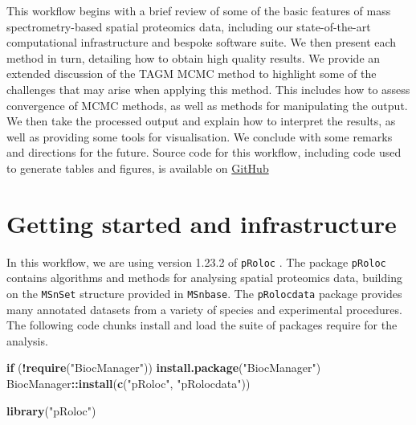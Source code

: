 \documentclass[9pt,a4paper,]{extarticle}
\newenvironment{Shaded}{\begin{snugshade}}{\end{snugshade}}
\newcommand{\ControlFlowTok}[1]{\textcolor[rgb]{0.13,0.29,0.53}{\textbf{#1}}}
\newcommand{\KeywordTok}[1]{\textcolor[rgb]{0.13,0.29,0.53}{\textbf{#1}}}
\newcommand{\NormalTok}[1]{#1}
\newcommand{\OperatorTok}[1]{\textcolor[rgb]{0.81,0.36,0.00}{\textbf{#1}}}
\newcommand{\StringTok}[1]{\textcolor[rgb]{0.31,0.60,0.02}{#1}}
\begin{document}
This workflow begins with a brief review of some of the basic features
of mass spectrometry-based spatial proteomics data, including our
state-of-the-art computational infrastructure and bespoke software
suite. We then present each method in turn, detailing how to obtain
high quality results. We provide an extended discussion of the TAGM
MCMC method to highlight some of the challenges that may arise when
applying this method. This includes how to assess convergence of MCMC
methods, as well as methods for manipulating the output. We then take
the processed output and explain how to interpret the results, as well
as providing some tools for visualisation. We conclude with some
remarks and directions for the future. Source code for this workflow,
including code used to generate tables and figures, is available on
\href{https://github.com/ococrook/TAGMworkflow}{GitHub}
\citep{oliver_m_crook_2019_2593712}

\hypertarget{getting-started-and-infrastructure}{%
\section{Getting started and infrastructure}\label{getting-started-and-infrastructure}}

In this workflow, we are using version 1.23.2 of \texttt{pRoloc}
\citep{pRoloc:2014}. The package \texttt{pRoloc} contains algorithms and methods
for analysing spatial proteomics data, building on the \texttt{MSnSet}
structure provided in \texttt{MSnbase}. The \texttt{pRolocdata} package provides
many annotated datasets from a variety of species and experimental
procedures. The following code chunks install and load the suite of
packages require for the analysis.

\begin{Shaded}
\begin{Highlighting}[]
\ControlFlowTok{if}\NormalTok{ (}\OperatorTok{!}\KeywordTok{require}\NormalTok{(}\StringTok{"BiocManager"}\NormalTok{))}
    \KeywordTok{install.package}\NormalTok{(}\StringTok{"BiocManager"}\NormalTok{)}
\NormalTok{BiocManager}\OperatorTok{::}\KeywordTok{install}\NormalTok{(}\KeywordTok{c}\NormalTok{(}\StringTok{"pRoloc"}\NormalTok{, }\StringTok{"pRolocdata"}\NormalTok{))}
\end{Highlighting}
\end{Shaded}

\begin{Shaded}
\begin{Highlighting}[]
\KeywordTok{library}\NormalTok{(}\StringTok{"pRoloc"}\NormalTok{)}
\end{Highlighting}
\end{Shaded}
\end{document}
